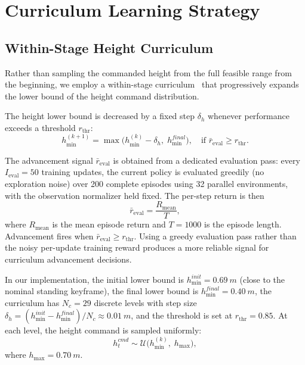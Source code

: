 \documentclass[conference]{IEEEtran}
\begin{document}
\section{Curriculum Learning Strategy}
\label{sec:curriculum}

\subsection{Within-Stage Height Curriculum}
Rather than sampling the commanded height from the full feasible range from the beginning, we employ a within-stage curriculum~\cite{bengio2009curriculum} that progressively expands the lower bound of the height command distribution.

The height lower bound is decreased by a fixed step $\delta_h$ whenever performance exceeds a threshold $r_{\mathrm{thr}}$:
\begin{equation}
h_{\min}^{(k+1)} = \max\!\big(h_{\min}^{(k)} - \delta_h,\; h_{\min}^{final}\big),
\quad \text{if } \bar{r}_{\mathrm{eval}} \geq r_{\mathrm{thr}}.
\label{eq:height_curriculum}
\end{equation}

The advancement signal $\bar{r}_{\mathrm{eval}}$ is obtained from a dedicated evaluation pass: every $I_{\mathrm{eval}} = 50$ training updates, the current policy is evaluated greedily (no exploration noise) over 200 complete episodes using 32 parallel environments, with the observation normalizer held fixed. The per-step return is then
\begin{equation}
\bar{r}_{\mathrm{eval}} = \frac{R_{\mathrm{mean}}}{T},
\label{eq:eval_per_step}
\end{equation}
where $R_{\mathrm{mean}}$ is the mean episode return and $T = 1000$ is the episode length. Advancement fires when $\bar{r}_{\mathrm{eval}} \geq r_{\mathrm{thr}}$. Using a greedy evaluation pass rather than the noisy per-update training reward produces a more reliable signal for curriculum advancement decisions.

In our implementation, the initial lower bound is $h_{\min}^{init} = \SI{0.69}{m}$ (close to the nominal standing keyframe), the final lower bound is $h_{\min}^{final} = \SI{0.40}{m}$, the curriculum has $N_c = 29$ discrete levels with step size $\delta_h = (h_{\min}^{init} - h_{\min}^{final})/N_c \approx \SI{0.01}{m}$, and the threshold is set at $r_{\mathrm{thr}} = 0.85$. At each level, the height command is sampled uniformly:
\begin{equation}
h_t^{cmd}\sim \mathcal{U}\big(h_{\min}^{(k)},\; h_{\max}\big),
\end{equation}
where $h_{\max} = \SI{0.70}{m}$.
\end{document}
